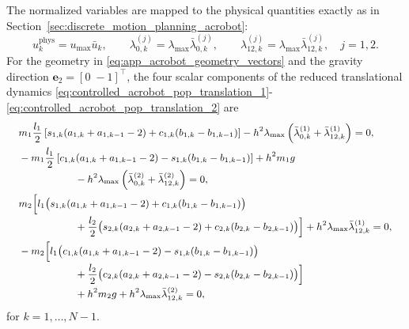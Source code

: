 The normalized variables are mapped to the physical quantities exactly as in
Section~\ref{sec:discrete_motion_planning_acrobot}:
\begin{equation}
u_k^{\mathrm{phys}}=u_{\max}\bar u_k,
\qquad
\lambda_{0,k}^{(j)}
=\lambda_{\max}\bar\lambda_{0,k}^{(j)},
\qquad
\lambda_{12,k}^{(j)}
=\lambda_{\max}\bar\lambda_{12,k}^{(j)},
\quad j=1,2.
\label{eq:app_acrobot_scaling}
\end{equation}
For the geometry in \eqref{eq:app_acrobot_geometry_vectors} and the gravity
direction \(\bm{e}_2=[0\;-1]^{\top}\), the four scalar components of the reduced
translational dynamics \eqref{eq:controlled_acrobot_pop_translation_1}-\eqref{eq:controlled_acrobot_pop_translation_2} are
\begin{subequations}
\label{eq:app_acrobot_scalar_translational_dynamics}
\begingroup
\small
\begin{align}
&m_1\frac{l_1}{2}
\left[
s_{1,k}(a_{1,k}+a_{1,k-1}-2)
+c_{1,k}(b_{1,k}-b_{1,k-1})
\right]
-h^2\lambda_{\max}
 \left(\bar\lambda_{0,k}^{(1)}
      +\bar\lambda_{12,k}^{(1)}\right)=0,
\label{eq:app_acrobot_translation_1x}\\
&-m_1\frac{l_1}{2}
\left[
c_{1,k}(a_{1,k}+a_{1,k-1}-2)
-s_{1,k}(b_{1,k}-b_{1,k-1})
\right]
+h^2m_1g
\notag\\[-0.2em]
&\hspace{5.5em}
-h^2\lambda_{\max}
 \left(\bar\lambda_{0,k}^{(2)}
      +\bar\lambda_{12,k}^{(2)}\right)=0,
\label{eq:app_acrobot_translation_1y}\\
&m_2\Bigl[
l_1\bigl(
s_{1,k}(a_{1,k}+a_{1,k-1}-2)
+c_{1,k}(b_{1,k}-b_{1,k-1})
\bigr)
\notag\\[-0.2em]
&\hspace{5.5em}
+\frac{l_2}{2}\bigl(
s_{2,k}(a_{2,k}+a_{2,k-1}-2)
+c_{2,k}(b_{2,k}-b_{2,k-1})
\bigr)
\Bigr]
+h^2\lambda_{\max}\bar\lambda_{12,k}^{(1)}=0,
\label{eq:app_acrobot_translation_2x}\\
&-m_2\Bigl[
l_1\bigl(
c_{1,k}(a_{1,k}+a_{1,k-1}-2)
-s_{1,k}(b_{1,k}-b_{1,k-1})
\bigr)
\notag\\[-0.2em]
&\hspace{5.5em}
+\frac{l_2}{2}\bigl(
c_{2,k}(a_{2,k}+a_{2,k-1}-2)
-s_{2,k}(b_{2,k}-b_{2,k-1})
\bigr)
\Bigr]
\label{eq:app_acrobot_translation_2y}\\[-0.2em]
&\hspace{5.5em}
+h^2m_2g
+h^2\lambda_{\max}\bar\lambda_{12,k}^{(2)}=0,
\notag
\end{align}
\endgroup
\end{subequations}
for $k=1,\ldots,N-1$.

